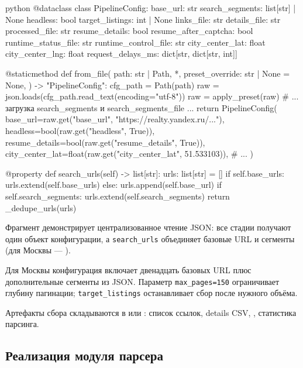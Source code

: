 \begin{singleminted}{python}
@dataclass
class PipelineConfig:
    base_url: str
    search_segments: list[str] | None
    headless: bool
    target_listings: int | None
    links_file: str
    details_file: str
    processed_file: str
    resume_details: bool
    resume_after_captcha: bool
    runtime_status_file: str
    runtime_control_file: str
    city_center_lat: float
    city_center_lng: float
    request_delays_ms: dict[str, dict[str, int]]

    @staticmethod
    def from_file(
        path: str | Path,
        *,
        preset_override: str | None = None,
    ) -> "PipelineConfig":
        cfg_path = Path(path)
        raw = json.loads(cfg_path.read_text(encoding="utf-8"))
        raw = apply_preset(raw)
        # ... загрузка search_segments и search_segments_file ...
        return PipelineConfig(
            base_url=raw.get("base_url", "https://realty.yandex.ru/..."),
            headless=bool(raw.get("headless", True)),
            resume_details=bool(raw.get("resume_details", True)),
            city_center_lat=float(raw.get("city_center_lat", 51.533103)),
            # ...
        )

    @property
    def search_urls(self) -> list[str]:
        urls: list[str] = []
        if self.base_urls:
            urls.extend(self.base_urls)
        else:
            urls.append(self.base_url)
        if self.search_segments:
            urls.extend(self.search_segments)
        return _dedupe_urls(urls)
\end{singleminted}
\label{lst:pipeline-config}

Фрагмент демонстрирует централизованное чтение JSON: все стадии получают один объект конфигурации, а \texttt{search\_urls} объединяет базовые URL и сегменты (для Москвы --- ).

Для Москвы конфигурация включает двенадцать базовых URL плюс дополнительные сегменты из JSON. Параметр \texttt{max\_pages=150} ограничивает глубину пагинации; \texttt{target\_listings} останавливает сбор после нужного объёма.

Артефакты сбора складываются в  или : список ссылок, details CSV, , статистика парсинга.

\subsection{Реализация модуля парсера}

